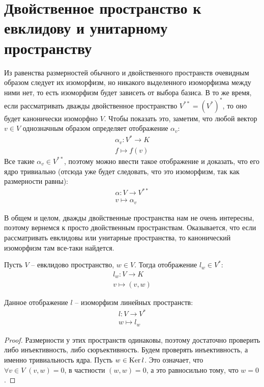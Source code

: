 \section{Двойственное пространство к евклидову и унитарному пространству}
Из равенства размерностей обычного и двойственного пространств очевидным образом следует их изоморфизм, но никакого выделенного изоморфизма между ними нет, то есть изоморфизм будет зависеть от выбора базиса.
В то же время, если рассматривать дважды двойственное пространство $V^{**} = (V^*)^*$, то оно будет канонически изоморфно $V$. 
Чтобы показать это, заметим, что любой вектор $v \in V$ однозначным образом определяет отображение $\alpha_v$: \begin{gather*}
    \alpha_v: V^* \to K \\
    f \mapsto f(v)
\end{gather*}
Все такие $\alpha_v \in V^{**}$, поэтому можно ввести такое отображение и доказать, что его ядро тривиально (отсюда уже будет следовать, что это изоморфизм, так как размерности равны): \begin{gather*}
    \alpha: V \to V^{**} \\
    v \mapsto \alpha_v
\end{gather*}

\vspace*{7mm}

В общем и целом, дважды двойственные пространства нам не очень интересны, поэтому вернемся к просто двойственным пространствам.
Оказывается, что если рассматривать евклидовы или унитарные пространства, то канонический изоморфизм там все-таки найдется.

Пусть $V$ -- евклидово пространство, $w \in V$. 
Тогда отображение $l_w \in V^*$: \begin{gather*}
    l_w: V \to K \\
    v \mapsto (v, w)
\end{gather*} 

\begin{theorem-non}
    Данное отображение $l$ -- изоморфизм линейных пространств: \begin{gather*}
        l: V \to  V^* \\
        w \mapsto  l_w
    \end{gather*}
\end{theorem-non}
\begin{proof}
    Размерности у этих пространств одинаковы, поэтому достаточно проверить либо инъективность, либо сюръективность.
    Будем проверять инъективность, а именно тривиальность ядра. Пусть $w \in \operatorname{Ker} l$. Это означает, что $\forall v \in V \; (v, w) = 0$, в частности $(w, w) = 0$, а это равносильно тому, что $w = 0$.
\end{proof}

